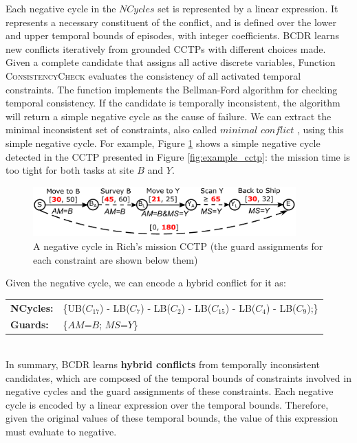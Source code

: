 \documentclass[jair,twoside,11pt,theapa]{article}
\begin{document}
Each negative cycle in the $NCycles$ set is represented by a linear expression.
It represents a necessary constituent of the conflict, and is defined over the
lower and upper temporal bounds of episodes, with integer coefficients. BCDR
learns new conflicts iteratively from grounded CCTPs with different choices made.
Given a complete candidate that assigns all active discrete variables, Function
\textsc{ConsistencyCheck} evaluates the consistency of all activated temporal
constraints. The function implements the Bellman-Ford algorithm
\cite{bellman1956routing,ford1956network} for checking temporal consistency. If
the candidate is temporally inconsistent, the algorithm will return a
simple negative cycle as the cause of failure. We can extract the minimal
inconsistent set of constraints, also called $minimal$ $conflict$
\cite{Liffiton_MUS_2005a}, using this simple negative cycle. For example, Figure
\ref{fig:negative_cycle_consistency} shows a simple negative cycle detected in
the CCTP presented in Figure \ref{fig:example_cctp}: the mission time is too
tight for both tasks at site $B$ and $Y$.


\begin{figure}[h!]
	\centering	
	\includegraphics[width=0.9\textwidth]{figures/negative_cycle_consistency.pdf}	
	\caption{A negative cycle in Rich's mission CCTP (the guard assignments for each
		constraint are shown below them)}
	\label{fig:negative_cycle_consistency}
\end{figure}


Given the negative cycle, we can encode a hybrid conflict for it as: \\

\begin{tabular}{m{2.5cm} m{11cm}}
	\textbf{NCycles:} & \{\textsc{UB}($C_{17}$) - \textsc{LB}($C_{7}$) -
	\textsc{LB}($C_{2}$) - \textsc{LB}($C_{15}$) - \textsc{LB}($C_{4}$) -
	\textsc{LB}($C_{9}$);\}\\
	\textbf{Guards:} 	& \{$AM$=$B$; $MS$=$Y$\}\\
\end{tabular}\\

In summary, BCDR learns \textbf{hybrid conflicts} from temporally inconsistent
candidates, which are composed of the temporal bounds of constraints involved in negative
cycles and the guard assignments of these constraints. Each negative cycle is
encoded by a linear expression over the temporal bounds. Therefore, given the
original values of these temporal bounds, the value of this expression must
evaluate to negative.
\end{document}
